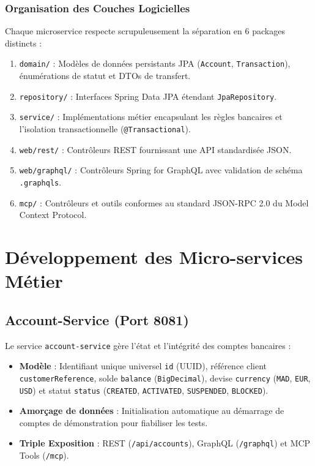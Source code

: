 \documentclass[11pt,a4paper]{report}
\begin{document}
\subsection{Organisation des Couches Logicielles}
Chaque microservice respecte scrupuleusement la séparation en 6 packages distincts :
\begin{enumerate}
    \item \texttt{domain/} : Modèles de données persistants JPA (\texttt{Account}, \texttt{Transaction}), énumérations de statut et DTOs de transfert.
    \item \texttt{repository/} : Interfaces Spring Data JPA étendant \texttt{JpaRepository}.
    \item \texttt{service/} : Implémentations métier encapsulant les règles bancaires et l'isolation transactionnelle (\texttt{@Transactional}).
    \item \texttt{web/rest/} : Contrôleurs REST fournissant une API standardisée JSON.
    \item \texttt{web/graphql/} : Contrôleurs Spring for GraphQL avec validation de schéma \texttt{.graphqls}.
    \item \texttt{mcp/} : Contrôleurs et outils conformes au standard JSON-RPC 2.0 du Model Context Protocol.
\end{enumerate}

\chapter{Développement des Micro-services Métier}

\section{Account-Service (Port 8081)}
Le service \texttt{account-service} gère l'état et l'intégrité des comptes bancaires :
\begin{itemize}
    \item \textbf{Modèle} : Identifiant unique universel \texttt{id} (UUID), référence client \texttt{customerReference}, solde \texttt{balance} (\texttt{BigDecimal}), devise \texttt{currency} (\texttt{MAD}, \texttt{EUR}, \texttt{USD}) et statut \texttt{status} (\texttt{CREATED}, \texttt{ACTIVATED}, \texttt{SUSPENDED}, \texttt{BLOCKED}).
    \item \textbf{Amorçage de données} : Initialisation automatique au démarrage de comptes de démonstration pour fiabiliser les tests.
    \item \textbf{Triple Exposition} : REST (\texttt{/api/accounts}), GraphQL (\texttt{/graphql}) et MCP Tools (\texttt{/mcp}).
\end{itemize}
\end{document}
